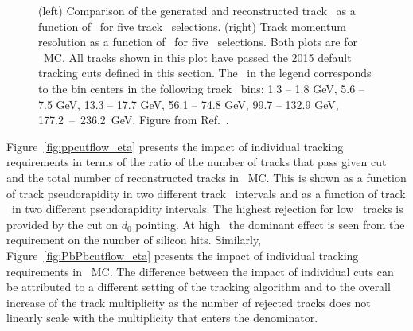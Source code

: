 \begin{figure}
\caption{(left) Comparison of the generated and reconstructed track \pt\ as a function of \etatrktruth\ for five track \pttrktruth\ selections.
(right) Track momentum resolution as a function of \etatrktruth\ for five \pttrktruth\ selections.
Both plots are for \pp\ MC.
All tracks shown in this plot have passed the 2015 default tracking cuts defined in this section.
The \pt\ in the legend corresponds to the bin centers in the following track \pt\ bins: 1.3 -- 1.8 GeV, 5.6 -- 7.5 GeV, 13.3 -- 17.7 GeV, 56.1 -- 74.8 GeV, 99.7 -- 132.9 GeV, \mbox{177.2 -- 236.2 GeV}.
Figure from Ref.~\cite{Sickles:2235420}.}
\label{fig:momres_pp}
\end{figure}



Figure~\ref{fig:ppcutflow_eta} presents the impact of individual tracking requirements in terms of the ratio of the number of tracks that pass given cut and the total number of reconstructed tracks in \pp\ MC.
This is shown as a function of track pseudorapidity in two different track \pT\ intervals and as a function of track \pT\ in two different pseudorapidity intervals.
The highest rejection for low \pT\ tracks is provided by the cut on $d_{0}$ pointing.
At high \pT\, the dominant effect is seen from the requirement on the number of silicon hits.
Similarly, Figure~\ref{fig:PbPbcutflow_eta} presents the impact of individual tracking requirements in \PbPb\ MC.
The difference between the impact of individual cuts can be attributed to a different setting of the tracking algorithm and to the overall increase of the track multiplicity as the number of rejected tracks does not linearly scale with the multiplicity that enters the denominator.



